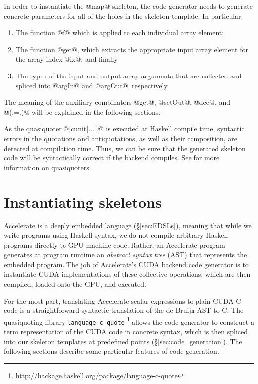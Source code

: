In order to instantiate the @map@ skeleton, the code generator needs to
generate concrete parameters for all of the holes in the skeleton template. In
particular:
%
\begin{enumerate}
\item The function @f@ which is applied to each individual array element;

\item The function @get@, which extracts the appropriate input array
    element for the array index @ix@; and finally

\item The types of the input and output array arguments that are collected and
    spliced into @argIn@ and @argOut@, respectively.

\end{enumerate}
%
The meaning of the auxiliary combinators @get@, @setOut@, @dce@, and @(.=.)@
will be explained in the following sections.

As the quasiquoter\qq{} @[cunit|...|]@ is executed at Haskell compile time,
syntactic errors in the quotations and antiquotations\aq{}, as well as their
composition, are detected at compilation time. Thus, we can be sure that the
generated skeleton code will be syntactically correct if the backend compiles.
See \cite{Mainland:2007bl} for more information on quasiquoters.


\section{Instantiating skeletons}
\label{sec:instantiating_skeletons}

\skeleton[|(]{}

Accelerate is a deeply embedded language (\S\ref{sec:EDSLs}), meaning that while we
write programs using Haskell syntax, we do not compile arbitrary Haskell
programs directly to GPU machine code. Rather, an Accelerate program generates
at program runtime an \emph{abstract syntax tree} (AST\AST{}) that represents
the embedded program.
The job of Accelerate's CUDA backend code generator is to instantiate CUDA
implementations of these collective operations, which are then compiled, loaded
onto the GPU, and executed.

For the most part, translating Accelerate scalar expressions to plain CUDA C
code is a straightforward syntactic translation of the de Bruijn AST
to C\@. The quasiquoting\qq{} library \texttt{language-c-quote}%
\footnote{\url{http://hackage.haskell.org/package/language-c-quote}} allows the
code generator to construct a term representation of the CUDA code in concrete
syntax, which is then spliced into our skeleton templates at predefined
points (\S\ref{sec:code_generation}). The following sections describe some
particular features of code generation.


